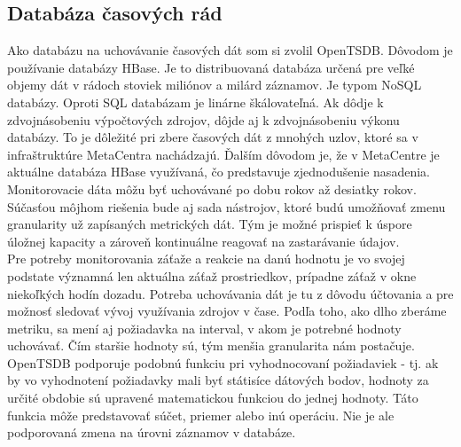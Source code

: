 \documentclass[12pt,twoside,color,cover,table]{fithesis3}
\begin{document}
\subsection{Databáza časových rád}
Ako databázu na uchovávanie časových dát som si zvolil OpenTSDB. Dôvodom je používanie databázy HBase. Je to distribuovaná databáza určená pre veľké objemy dát v rádoch stoviek miliónov a milárd záznamov. 
Je typom NoSQL databázy. Oproti SQL databázam je linárne škálovateľná. Ak dôdje k zdvojnásobeniu výpočtových zdrojov, dôjde aj k zdvojnásobeniu výkonu databázy. To je dôležité pri zbere časových dát z mnohých
uzlov, ktoré sa v infraštruktúre MetaCentra nachádzajú. Ďalším dôvodom je, že v MetaCentre je aktuálne databáza HBase využívaná, čo predstavuje zjednodušenie nasadenia. 
\\Monitorovacie dáta môžu byť uchovávané po dobu rokov až desiatky rokov. Súčasťou môjhom riešenia bude aj sada nástrojov, ktoré budú
umožňovať zmenu granularity už zapísaných metrických dát. Tým je možné prispieť k úspore úložnej kapacity a zároveň kontinuálne reagovať na
zastarávanie údajov. 
\\Pre potreby monitorovania záťaže a reakcie na danú hodnotu je vo svojej podstate významná len aktuálna záťaž prostriedkov, prípadne záťaž v okne niekoľkých hodín 
dozadu. Potreba uchovávania dát je tu z dôvodu účtovania a pre možnosť sledovať vývoj využívania zdrojov v čase.
Podľa toho, ako dlho zberáme metriku, sa mení aj požiadavka na interval, v akom je potrebné hodnoty uchovávať. Čím staršie hodnoty sú,
tým menšia granularita nám postačuje.
\\OpenTSDB podporuje podobnú funkciu pri vyhodnocovaní požiadaviek - tj. ak by vo vyhodnotení požiadavky mali byť státisíce dátových bodov,
hodnoty za určité obdobie sú upravené matematickou funkciou do jednej hodnoty. Táto funkcia môže predstavovať súčet, priemer alebo inú operáciu. Nie je ale podporovaná 
zmena na úrovni záznamov v databáze.
  
\end{document}
